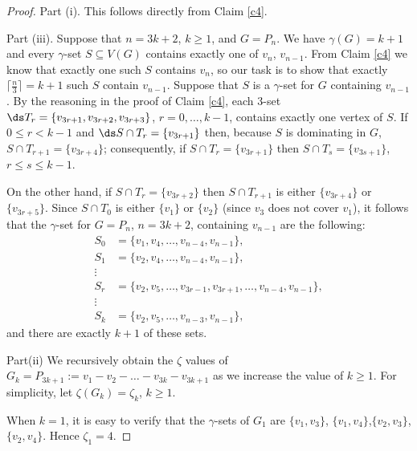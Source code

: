 \documentclass[twoside,12pt]{article}
\begin{document}
\begin{proof}
	Part (i). This follows directly from Claim \ref{c4}. %
	\newline
	
	Part (iii).
   	Suppose that $n=3k+2$, $k\ge 1$, and $G=P_n$. We have $\gamma(G)=k+1$ and every $\gamma$-set $S\subseteq V(G)$ contains exactly one of $v_n$, $v_{n-1}$. From Claim \ref{c4} we know that exactly one such $S$ contains $v_n$, so our task is to show that exactly ${\lceil \frac{n}{3} \rceil}=k+1$ such $S$ contain $v_{n-1}$.
	Suppose that $S$ is a $\gamma$-set for $G$ containing $v_{n-1}$. By the reasoning in the proof of Claim \ref{c4}, each $3$-set $\ds T_r=\{v_{3r+1},v_{3r+2},v_{3r+3}\}$, $r=0,\ldots,k-1$, contains exactly one vertex of $S$. 
	\indent If $0\le r< k-1$ and $\ds S\cap T_r=\{v_{3r+1}\}$ then, because $S$ is dominating in $G$, $S\cap T_{r+1}=\{v_{3r+4}\}$; consequently, if $S\cap T_r=\{v_{3r+1}\}$ then $S\cap T_s=\{v_{3s+1}\}$, $r\le s \le k-1$. 
	
	\indent On the other hand, if $S\cap T_r=\{v_{3r+2}\}$ then $S\cap T_{r+1}$ is either $\{v_{3r+4}\}$ or $\{v_{3r+5}\}$. Since $S\cap T_{0}$ is either $\{v_1\}$ or $\{v_2\}$ (since $v_3$ does not cover $v_1$), it follows that the $\gamma$-set for $G=P_n$, $n=3k+2$, containing $v_{n-1}$ are the following:
	\begin{align}
	    S_0&=\{v_1,v_4,\ldots,v_{n-4},v_{n-1}\},\nonumber \\
	     S_1&=\{v_2,v_4,\ldots,v_{n-4},v_{n-1}\},\nonumber \\
	     \vdots \nonumber \\
	     S_r&=\{v_2,v_5,\ldots,v_{3r-1},v_{3r+1},\ldots,  v_{n-4},v_{n-1}\},\nonumber \\
	     \vdots \nonumber \\
	     S_k&=\{v_2,v_5,\ldots,v_{n-3},v_{n-1}\}, \nonumber
	\end{align}
and there are exactly $k+1$ of these sets.

	Part(ii)
	We recursively obtain the $\zeta$ values of $G_k=P_{3k+1}:=v_1-v_2-\ldots-v_{3k}-v_{3k+1}$ as we increase the value of $k\ge 1$. For simplicity, let $\zeta(G_k)=\zeta_k$, $k\ge 1$.
	
	When $k=1$, it is easy to verify that the $\gamma$-sets of $G_1$ are $\{v_1,v_3\}$, $\{v_1,v_4\}$,$\{v_2,v_3\}$, $\{v_2,v_4\}$. Hence $\zeta_1=4$.
	

\end{proof}
\end{document}

